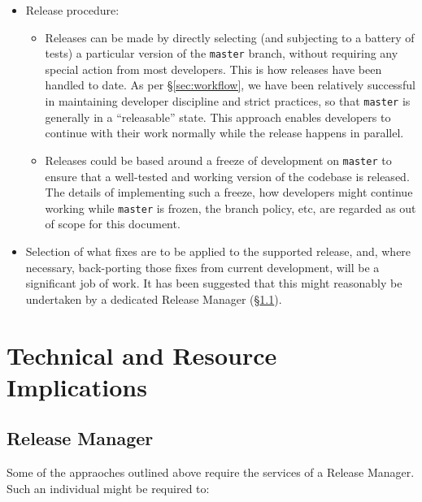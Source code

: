 \documentclass[letterpaper]{scrartcl}
\begin{document}
\begin{itemize}

  \item{Release procedure:

    \begin{itemize}

      \item{Releases can be made by directly selecting (and subjecting to a
      battery of tests) a particular version of the \texttt{master} branch,
      without requiring any special action from most developers. This is how
      releases have been handled to date. As per \S\ref{sec:workflow}, we have
      been relatively successful in maintaining developer discipline and
      strict practices, so that \texttt{master} is generally in a
      ``releasable'' state. This approach enables developers to continue with
      their work normally while the release happens in parallel.}

      \item{Releases could be based around a freeze of development on
      \texttt{master} to ensure that a well-tested and working version of the
      codebase is released. The details of implementing such a freeze, how
      developers might continue working while \texttt{master} is frozen, the
      branch policy, etc, are regarded as out of scope for this document.}

    \end{itemize}

  }

  \item{Selection of what fixes are to be applied to the supported release,
  and, where necessary, back-porting those fixes from current development,
  will be a significant job of work. It has been suggested that this might
  reasonably be undertaken by a dedicated Release Manager
  (\S\ref{sec:releasemanager}).}

\end{itemize}

\section{Technical and Resource Implications}
\label{sec:resource}

\subsection{Release Manager}
\label{sec:releasemanager}

Some of the appraoches outlined above require the services of a Release
Manager. Such an individual might be required to:
\end{document}
